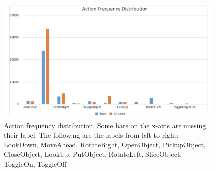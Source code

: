 \documentclass[11pt,a4paper]{article}
\begin{document}
\begin{table}[]
\centering
{}
\caption{Distribution of actions for successful and failed tasks for the MOCA baseline}
\label{tab:other_big}
\end{table}


\begin{figure}
    \centering
    \includegraphics[width=\linewidth]{Reports/4-Analysis-of-Baselines/ac_freq.png}
    \caption{Action frequency distribution. Some bars on the x-axis are missing their label. The following are the labels from left to right: LookDown, MoveAhead, RotateRight, OpenObject, PickupObject, CloseObject, LookUp, PutObject, RotateLeft, SliceObject, ToggleOn, ToggleOff }
    \label{fig:act_freq}
\end{figure}
\end{document}
